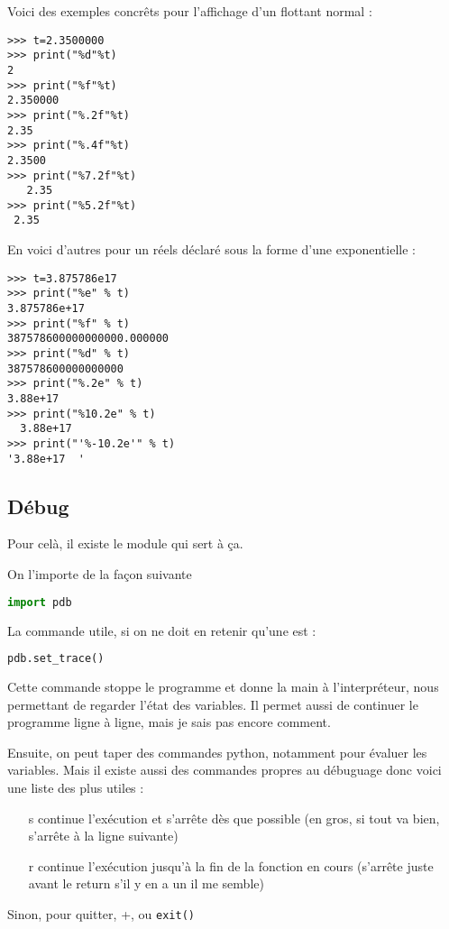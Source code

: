 \documentclass[a4paper,twoside]{article}
\begin{document}
\bigskip

Voici des exemples concrêts pour l'affichage d'un flottant normal : 
\begin{verbatim}
>>> t=2.3500000
>>> print("%d"%t)
2
>>> print("%f"%t)
2.350000
>>> print("%.2f"%t)
2.35
>>> print("%.4f"%t)
2.3500
>>> print("%7.2f"%t)
   2.35
>>> print("%5.2f"%t)
 2.35
\end{verbatim}

En voici d'autres pour un réels déclaré sous la forme d'une exponentielle :
\begin{verbatim}
>>> t=3.875786e17
>>> print("%e" % t)
3.875786e+17
>>> print("%f" % t)
387578600000000000.000000
>>> print("%d" % t)
387578600000000000
>>> print("%.2e" % t)
3.88e+17
>>> print("%10.2e" % t)
  3.88e+17
>>> print("'%-10.2e'" % t)
'3.88e+17  '
\end{verbatim}



\subsection{Débug}
Pour celà, il existe le module  qui sert à ça.

On l'importe de la façon suivante
\begin{lstlisting}[language=python]
import pdb
\end{lstlisting}

La commande utile, si on ne doit en retenir qu'une est :
\begin{lstlisting}[language=python]
pdb.set_trace()
\end{lstlisting}

Cette commande stoppe le programme et donne la main à l'interpréteur, nous permettant de regarder l'état des variables. Il permet aussi de continuer le programme ligne à ligne, mais je sais pas encore comment.

Ensuite, on peut taper des commandes python, notamment pour évaluer les variables. Mais il existe aussi des commandes propres au débuguage donc voici une liste des plus utiles :
\begin{itemize}
\item[s] continue l'exécution et s'arrête dès que possible (en gros, si tout va bien, s'arrête à la ligne suivante)
\item[r] continue l'exécution jusqu'à la fin de la fonction en cours (s'arrête juste avant le return s'il y en a un il me semble)
\end{itemize}
Sinon, pour quitter, +, ou \texttt{exit()}
\end{document}
